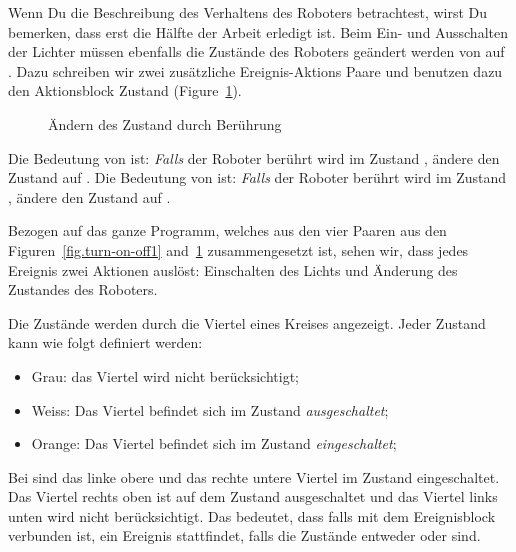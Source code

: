 Wenn Du die Beschreibung des Verhaltens des Roboters betrachtest, wirst Du bemerken, dass erst die Hälfte der Arbeit erledigt ist. Beim Ein- und Ausschalten der Lichter müssen ebenfalls die Zustände des Roboters geändert werden von  auf  . Dazu schreiben wir zwei zusätzliche Ereignis-Aktions Paare und benutzen dazu den Aktionsblock Zustand  (Figure~\ref{fig.turn-on-off2}).

\begin{figure}
\begin{center}
\caption{Ändern des Zustand durch Berührung}
\label{fig.turn-on-off2}
\end{center}
\end{figure}

Die Bedeutung von  ist: \emph{Falls} der Roboter berührt wird
im Zustand , ändere den Zustand auf .
Die Bedeutung von  ist: \emph{Falls} der Roboter berührt wird im Zustand , ändere den Zustand auf .

Bezogen auf das ganze Programm, welches aus den vier Paaren aus den Figuren~\ref{fig.turn-on-off1} and~\ref{fig.turn-on-off2} zusammengesetzt ist, sehen wir, dass jedes Ereignis zwei Aktionen auslöst: Einschalten des Lichts und Änderung des Zustandes des Roboters.


Die Zustände werden durch die Viertel eines Kreises angezeigt. Jeder Zustand kann wie folgt definiert werden:
\begin{itemize}

\item Grau: das Viertel wird nicht berücksichtigt;
\item Weiss: Das Viertel befindet sich im Zustand \emph{ausgeschaltet};
\item Orange: Das Viertel befindet sich im Zustand \emph{eingeschaltet};

\end{itemize}

Bei  sind das linke obere und das rechte untere Viertel im Zustand eingeschaltet. Das Viertel rechts oben ist auf dem Zustand ausgeschaltet und das Viertel links unten wird nicht berücksichtigt. Das bedeutet, dass falls  mit dem Ereignisblock verbunden ist, ein Ereignis stattfindet, falls die Zustände entweder  oder  sind.

